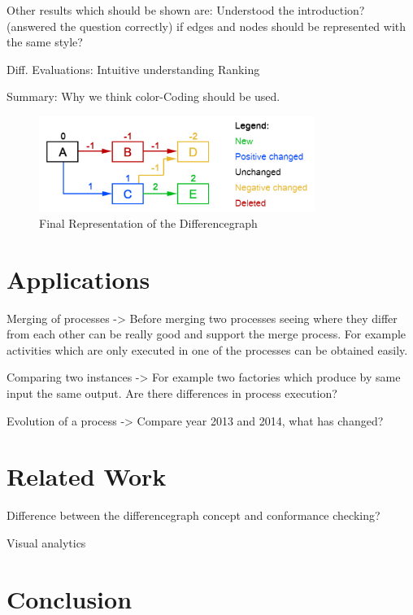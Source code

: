 \documentclass{llncs}
\begin{document}
Other results which should be shown are:
Understood the introduction? (answered the question correctly)
if edges and nodes should be represented with the same style?


Diff. Evaluations:
Intuitive understanding
Ranking



Summary:
Why we think color-Coding should be used.

\begin{figure}
	\centering
	\includegraphics[width=0.8\textwidth]{Images/ColorCodedGraph.PNG}
	\caption{Final Representation of the Differencegraph}
	\label{fig:DiffGraphVisualization}
\end{figure}

\section{Applications}  %
\label{sec:Applications}

Merging of processes -> Before merging two processes seeing where they differ from each other can be really good and support the merge process. For example activities which are only executed in one of the processes can be obtained easily.

Comparing two instances -> For example two factories which produce by same input the same output. Are there differences in process execution?

Evolution of a process -> Compare year 2013 and 2014, what has changed?


\section{Related Work}  %
\label{sec:RelatedWork}

Difference between the differencegraph concept and conformance checking?

Visual analytics


\section{Conclusion} %
\label{sec:Conclusion}




\end{document}
